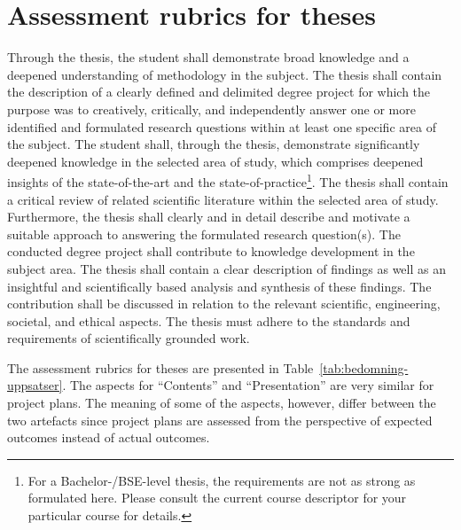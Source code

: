 \documentclass[a4paper,12pt]{book}
\begin{document}
\section{Assessment rubrics for theses}
Through the thesis, the student shall demonstrate broad knowledge and a deepened
understanding of methodology in the subject. The thesis shall contain the description
of a clearly defined and delimited degree project for which the purpose was to
creatively, critically, and independently answer one or more identified and formulated
research questions within at least one specific area of the subject. The student shall,
through the thesis, demonstrate significantly deepened knowledge in the selected area
of study, which comprises deepened insights of the state-of-the-art and the
state-of-practice\footnote{For a Bachelor-/BSE-level thesis, the requirements are not as
strong as formulated here. Please consult the current course descriptor for your
particular course for details.}\saveFN\bach.
The thesis shall contain a critical review of related scientific literature within the
selected area of study. Furthermore, the thesis shall clearly and in detail describe and
motivate a suitable approach to answering the formulated research question(s).
The conducted degree project shall contribute to knowledge development in the
subject area\useFN\bach.
The thesis shall contain a clear description of findings as well as an
insightful and scientifically based analysis and synthesis of these findings.
The contribution shall be discussed in relation to the
relevant scientific, engineering, societal, and ethical aspects. The thesis must adhere
to the standards and requirements of scientifically grounded work.

The assessment rubrics for theses are presented in Table~\ref{tab:bedomning-uppsatser}.
The aspects for ``Contents'' and ``Presentation'' are very similar for project plans.
The meaning of some of the aspects, however, differ between the two
artefacts since project plans are assessed from the perspective of expected outcomes
instead of actual outcomes.
\end{document}
